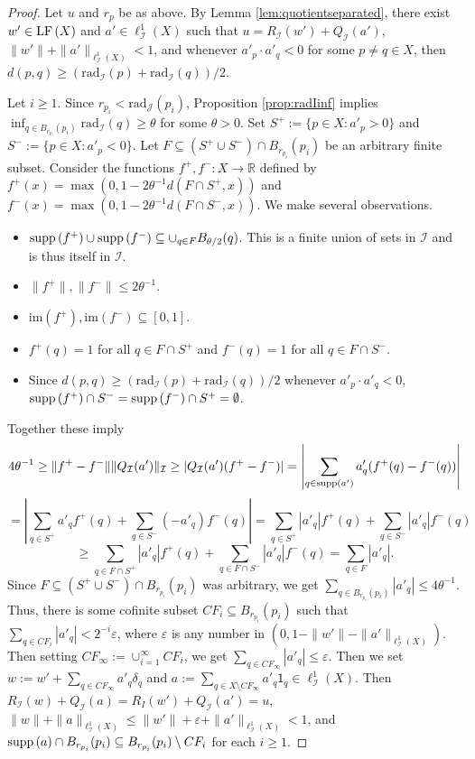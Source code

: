 \documentclass[12pt]{amsart}
\theoremstyle{definition}
\numberwithin{equation}{section}
\def \R {\mathbb{R}}
\def \I {\mathcal{I}}
\def \J {\mathcal{J}}
\def \sbs {\subseteq}
\def \eps {\varepsilon}
\def \im {\mathrm{im}}
\def \one {\mathsf{1}}
\renewcommand{\l}[2]{\ell^1_{#1}\left( #2 \right)}
\newcommand{\rad}[2]{\mathrm{rad}_{#1}\left(#2\right)}
\begin{document}
\begin{proof}
Let $u$ and $r_p$ be as above. By Lemma \ref{lem:quotientseparated}, there exist $w' \in \LF{X}$ and $a' \in \l{\I}{X}$ such that $u = R_\I(w') + Q_\I(a')$, $\|w'\|+\|a'\|_{\l{\I}{X}} < 1$, and whenever $a'_p \cdot a'_q < 0$ for some $p \neq q \in X$, then $d(p,q) \geq (\rad{\I}{p}+\rad{\I}{q})/2$.

Let $i \geq 1$. Since $r_{p_i} < \rad{\J}{p_i}$, Proposition \ref{prop:radIinf} implies \\ $\inf_{q \in  B_{r_{p_i}}(p_i)} \rad{\I}{q} \geq \theta$ for some $\theta > 0$. Set $S^+ := \{p \in X: a'_p > 0\}$ and $S^- := \{p \in X: a'_p < 0\}$. Let $F \sbs (S^+ \cup S^-) \cap B_{r_{p_i}}(p_i)$ be an arbitrary finite subset. Consider the functions $f^+,f^-: X \to \R$ defined by $f^+(x) = \max(0,1-2\theta^{-1}d(F \cap S^+,x))$ and $f^-(x) = \max(0,1-2\theta^{-1}d(F \cap S^-,x))$. We make several observations.
\begin{itemize}
\item $\supp{f^+} \cup \supp{f^-} \sbs \cup_{q \in F} B_{\theta/2}(q)$. This is a finite union of sets in $\I$ and is thus itself in $\I$.
\item $\|f^+\|,\|f^-\| \leq 2\theta^{-1}$.
\item $\im(f^+),\im(f^-) \sbs [0,1]$.
\item $f^+(q) = 1$ for all $q \in F \cap S^+$ and $f^-(q) = 1$ for all $q \in F \cap S^-$.
\item Since $d(p,q) \geq (\rad{\I}{p}+\rad{\I}{q})/2$ whenever $a'_p \cdot a'_q < 0$, $\supp{f^+} \cap S^- = \supp{f^-} \cap S^+ = \emptyset$.
\end{itemize}
Together these imply
$$4\theta^{-1} \geq \|f^+-f^-\|\|Q_\I(a')\|_\I \geq |Q_\I(a')(f^+-f^-)| = \left|\sum_{q \in \supp{a'}} a'_q(f^+(q)-f^-(q))\right|$$
$$= \left|\sum_{q \in S^+} a'_qf^+(q) + \sum_{q \in S^-} (-a'_q)f^-(q)\right| = \sum_{q \in S^+} |a'_q|f^+(q) + \sum_{q \in S^-} |a'_q|f^-(q)$$
$$\geq \sum_{q \in F \cap S^+} |a'_q|f^+(q) + \sum_{q \in F \cap S^-} |a'_q|f^-(q) = \sum_{q \in F} |a'_q|.$$
Since $F \sbs (S^+ \cup S^-) \cap B_{r_{p_i}}(p_i)$ was arbitrary, we get $\sum_{q \in B_{r_{p_i}}(p_i)} |a'_q| \leq 4\theta^{-1}$. Thus, there is some cofinite subset $CF_i \sbs B_{r_{p_i}}(p_i)$ such that $\sum_{q \in CF_i} |a'_q| < 2^{-i}\eps$, where $\eps$ is any number in $(0,1-\|w'\|-\|a'\|_{\l{\I}{X}})$. Then setting $CF_\infty := \cup_{i=1}^\infty CF_i$, we get $\sum_{q \in CF_\infty} |a'_q| \leq \eps$. Then we set $w := w' + \sum_{q \in CF_\infty} a'_q\delta_q$ and $a := \sum_{q \in X \setminus CF_\infty} a'_q\one_q \in \l{\I}{X}$. Then $R_\I(w) + Q_\I(a) = R_I(w') + Q_\I(a') = u$, $\|w\| + \|a\|_{\l{\I}{X}} \leq \|w'\| + \eps + \|a'\|_{\l{\I}{X}} < 1$, and $\supp{a} \cap B_{r_{p_i}}(p_i) \sbs B_{r_{p_i}}(p_i) \setminus CF_i$ for each $i \geq 1$.
\end{proof}
\end{document}
